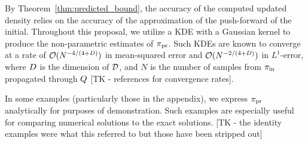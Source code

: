 By Theorem~\ref{thm:predicted_bound}, the accuracy of the computed updated density relies on the accuracy of the approximation of the push-forward of the initial.
Throughout this proposal, we utilize a KDE with a Gaussian kernel to produce the non-parametric estimates of $\operatorname*{\pi_{pr}}$.
Such KDEs are known to converge at a rate of $\mathcal{O}(N^{-4/(4+D)})$ in mean-squared error and $\mathcal{O}(N^{-2/(4+D)})$ in $L^1$-error, where $D$ is the dimension of $\mathcal{D}$, and $N$ is the number of samples from $\operatorname*{\pi_{in}}$ propagated through $Q$ [TK - references for convergence rates].

%
%
%


In some examples (particularly those in the appendix), we express $\operatorname*{\pi_{pr}}$ analytically for purposes of demonstration.
Such examples are especially useful for comparing numerical solutions to the exact solutions.
[TK - the identity examples were what this referred to but those have been stripped out]
